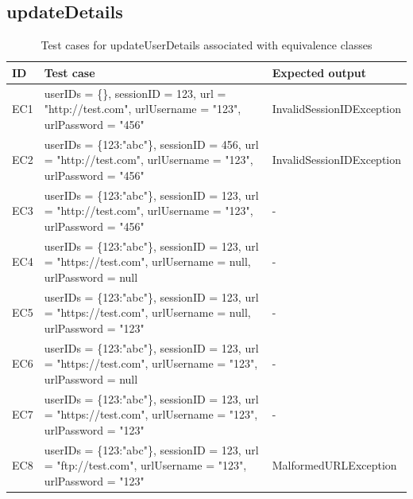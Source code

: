 \documentclass{article}
\begin{document}
\subsection{updateDetails}
\begin{longtable}{|p{2cm}|p{7cm}|p{5cm}|}
\caption{Test cases for updateUserDetails associated with equivalence classes}\\
\hline 
ID&Test case&Expected output\\
\hline  
EC1&userIDs = \{\}, sessionID = 123, url = "http://test.com", urlUsername = "123", urlPassword = "456"&InvalidSessionIDException\\
\hline
EC2&userIDs = \{123:"abc"\}, sessionID = 456, url = "http://test.com", urlUsername = "123", urlPassword = "456"&InvalidSessionIDException\\
\hline
EC3&userIDs = \{123:"abc"\}, sessionID = 123, url = "http://test.com", urlUsername = "123", urlPassword = "456"&-\\
\hline
EC4&userIDs = \{123:"abc"\}, sessionID = 123, url = "https://test.com", urlUsername = null, urlPassword = null&-\\
\hline
EC5&userIDs = \{123:"abc"\}, sessionID = 123, url = "https://test.com", urlUsername = null, urlPassword = "123"&-\\
\hline
EC6&userIDs = \{123:"abc"\}, sessionID = 123, url = "https://test.com", urlUsername = "123", urlPassword = null&-\\
\hline
EC7&userIDs = \{123:"abc"\}, sessionID = 123, url = "https://test.com", urlUsername = "123", urlPassword = "123"&-\\
\hline
EC8&userIDs = \{123:"abc"\}, sessionID = 123, url = "ftp://test.com", urlUsername = "123", urlPassword = "123"&MalformedURLException\\
\hline
\end{longtable}
\end{document}
